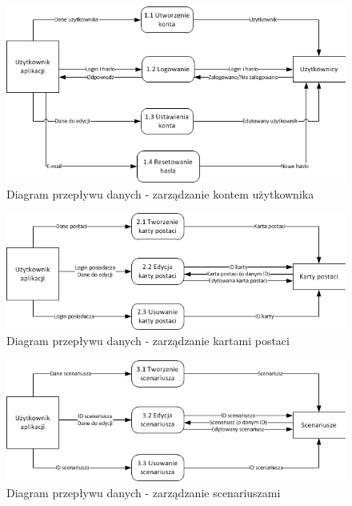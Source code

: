 \begin{figure}[h!]
\begin{center}
\centerline{\includegraphics[scale=1]{./img/DFD-user.png}}
\caption[Diagram przepływu danych - zarządzanie kontem użytkownika]{Diagram przepływu danych - zarządzanie kontem użytkownika}
\label{fig:DFD-user}
\end{center}
\end{figure}

\begin{figure}[h!]
\begin{center}
\centerline{\includegraphics[scale=1]{./img/DFD-chars.png}}
\caption[Diagram przepływu danych - zarządzanie kartami postaci]{Diagram przepływu danych - zarządzanie kartami postaci}
\label{fig:DFD-chars}
\end{center}
\end{figure}

\begin{figure}[h!]
\begin{center}
\centerline{\includegraphics[scale=1]{./img/DFD-scenarios.png}}
\caption[Diagram przepływu danych - zarządzanie scenariuszami]{Diagram przepływu danych - zarządzanie scenariuszami}
\label{fig:DFD-scenarios}
\end{center}
\end{figure}

